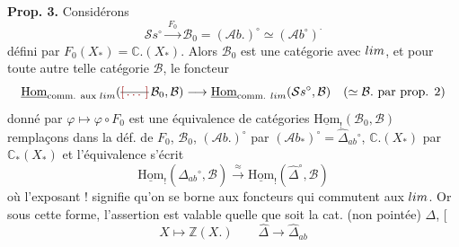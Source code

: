 \documentclass[11pt,a4paper]{article}
\begin{document}

\textbf{Prop. 3.} Considérons
\[
  \mathcal{S}s^{\circ} \xrightarrow{\ F_{0}\ } \mathcal{B}_{0} = (\mathcal{A}b.)^{\circ} \simeq (\mathcal{A}b^{\circ})^{\cdot}
\]
défini par $F_{0}(X_{*}) = \mathbb{C}.(X_{*})$. Alors $\mathcal{B}_{0}$ est une
catégorie  avec $\varprojlim$, et pour toute autre telle catégorie
$\mathcal{B}$, le foncteur
\[
  \underline{\mathrm{Hom}}_{\text{comm. aux } \varprojlim}(\text{\struck{\ill{}}}\,\mathcal{B}_{0}, \mathcal{B})
  \longrightarrow \underline{\mathrm{Hom}}_{\text{comm. } \varprojlim}(\mathcal{S}s^{\circ}, \mathcal{B})
  \quad (\simeq \mathcal{B}. \text{ par prop. 2})
\]
donné par $\varphi \longmapsto \varphi \circ F_{0}$ est une équivalence de catégories
$\underline{\mathrm{Hom}}_{!}(\mathcal{B}_{0}, \mathcal{B})$ remplaçons dans la déf. de
$F_{0}$, $\mathcal{B}_{0}$, $(\mathcal{A}b.)^{\circ}$ par
$(\mathcal{A}b_{*})^{\circ} = \widehat{\Delta}_{ab}{}^{\circ}$, $\mathbb{C}.(X_{*})$ par
$\mathbb{C}_{*}(X_{*})$  et l'équivalence s'écrit
\[
  \underline{\mathrm{Hom}}_{!}(\widehat{\Delta}_{ab}{}^{\circ}, \mathcal{B})
  \xrightarrow{\ \approx\ } \underline{\mathrm{Hom}}_{!}(\widehat{\Delta}^{\circ}, \mathcal{B})
\]
où l'exposant $!$ signifie qu'on se borne aux foncteurs qui commutent aux $\varprojlim$.
Or sous cette forme, l'assertion est valable quelle que soit la cat. (non pointée)
$\Delta$, [ 
\[
  X \longmapsto \mathbb{Z}(X.) \qquad \widehat{\Delta} \longrightarrow \widehat{\Delta}_{ab}
\]
 
\end{document}
